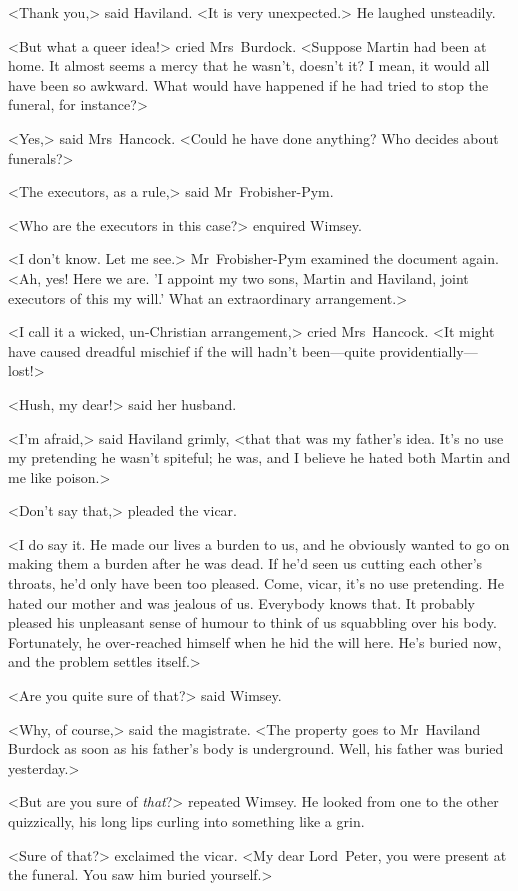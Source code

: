 <Thank you,> said Haviland. <It is very unexpected.> He laughed unsteadily.

<But what a queer idea!> cried Mrs~Burdock. <Suppose Martin had been at home. It almost seems a mercy that he wasn't, doesn't it? I mean, it would all have been so awkward. What would have happened if he had tried to stop the funeral, for instance?>

<Yes,> said Mrs~Hancock. <Could he have done anything? Who decides about funerals?>

<The executors, as a rule,> said Mr~Frobisher-Pym.

<Who are the executors in this case?> enquired Wimsey.

<I don't know. Let me see.> Mr~Frobisher-Pym examined the document again. <Ah, yes! Here we are. 'I appoint my two sons, Martin and Haviland, joint executors of this my will.' What an extraordinary arrangement.>

<I call it a wicked, un-Christian arrangement,> cried Mrs~Hancock. <It might have caused dreadful mischief if the will hadn't been—quite providentially—lost!>

<Hush, my dear!> said her husband.

<I'm afraid,> said Haviland grimly, <that that was my father's idea. It's no use my pretending he wasn't spiteful; he was, and I believe he hated both Martin and me like poison.>

<Don't say that,> pleaded the vicar.

<I do say it. He made our lives a burden to us, and he obviously wanted to go on making them a burden after he was dead. If he'd seen us cutting each other's throats, he'd only have been too pleased. Come, vicar, it's no use pretending. He hated our mother and was jealous of us. Everybody knows that. It probably pleased his unpleasant sense of humour to think of us squabbling over his body. Fortunately, he over-reached himself when he hid the will here. He's buried now, and the problem settles itself.>

<Are you quite sure of that?> said Wimsey.

<Why, of course,> said the magistrate. <The property goes to Mr~Haviland Burdock as soon as his father's body is underground. Well, his father was buried yesterday.>

<But are you sure of \emph{that}?> repeated Wimsey. He looked from one to the other quizzically, his long lips curling into something like a grin.

<Sure of that?> exclaimed the vicar. <My dear Lord~Peter, you were present at the funeral. You saw him buried yourself.>

